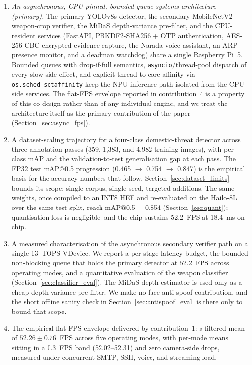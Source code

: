 \documentclass{ieeeaccess}
\begin{document}
\begin{enumerate}
\item \emph{An asynchronous, CPU-pinned, bounded-queue systems architecture (primary).} The primary YOLOv8s detector, the secondary MobileNetV2 weapon-crop verifier, the MiDaS depth-variance pre-filter, and the CPU-resident services (FastAPI, PBKDF2-SHA256 + OTP authentication, AES-256-CBC encrypted evidence capture, the Narada voice assistant, an ARP presence monitor, and a deadman watchdog) share a single Raspberry Pi~5. Bounded queues with drop-if-full semantics, \texttt{asyncio}/thread-pool dispatch of every slow side effect, and explicit thread-to-core affinity via \texttt{os.sched\_setaffinity} keep the NPU inference path isolated from the CPU-side services. The flat-FPS envelope reported in contribution~4 is a property of this co-design rather than of any individual engine, and we treat the architecture itself as the primary contribution of the paper (Section~\ref{sec:async_fps}).
\item A dataset-scaling trajectory for a four-class domestic-threat detector across three annotation passes (359, 1{,}383, and 4{,}982 training images), with per-class mAP and the validation-to-test generalisation gap at each pass. The FP32 test mAP{@}0.5 progression (0.465 $\rightarrow$ 0.754 $\rightarrow$ 0.847) is the empirical basis for the accuracy numbers that follow. Section~\ref{sec:dataset_limits} bounds its scope: single corpus, single seed, targeted additions. The same weights, once compiled to an INT8 HEF and re-evaluated on the Hailo-8L over the same test split, reach mAP{@}0.5 = 0.854 (Section~\ref{sec:quant}); quantisation loss is negligible, and the chip sustains 52.2~FPS at 18.4~ms on-chip.
\item A measured characterisation of the asynchronous secondary verifier path on a single 13~TOPS VDevice. We report a per-stage latency budget, the bounded non-blocking queue that holds the primary detector at 52.2~FPS across operating modes, and a quantitative evaluation of the weapon classifier (Section~\ref{sec:classifier_eval}). The MiDaS depth estimator is used only as a cheap depth-variance pre-filter. We make no face-anti-spoof contribution, and the short offline sanity check in Section~\ref{sec:antispoof_eval} is there only to bound that scope.
\item The empirical flat-FPS envelope delivered by contribution~1: a filtered mean of $52.26 \pm 0.76$~FPS across five operating modes, with per-mode means sitting in a 0.3~FPS band (52.02--52.31) and zero camera-side drops, measured under concurrent SMTP, SSH, voice, and streaming load.
\end{enumerate}
\end{document}
